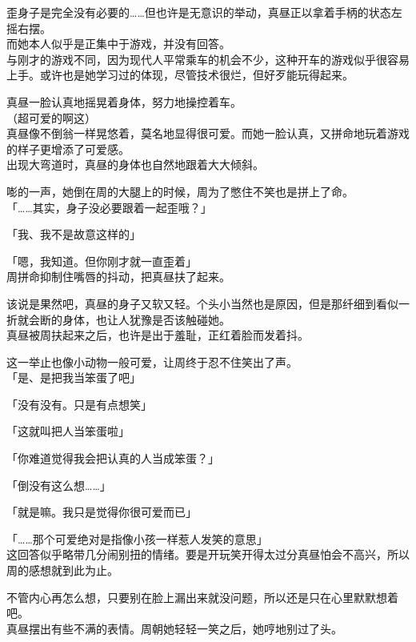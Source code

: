 歪身子是完全没有必要的……但也许是无意识的举动，真昼正以拿着手柄的状态左摇右摆。\\

而她本人似乎是正集中于游戏，并没有回答。\\

与刚才的游戏不同，因为现代人平常乘车的机会不少，这种开车的游戏似乎很容易上手。或许也是她学习过的体现，尽管技术很烂，但好歹能玩得起来。

真昼一脸认真地摇晃着身体，努力地操控着车。\\

（超可爱的啊这）\\

真昼像不倒翁一样晃悠着，莫名地显得很可爱。而她一脸认真，又拼命地玩着游戏的样子更增添了可爱感。\\

出现大弯道时，真昼的身体也自然地跟着大大倾斜。

嘭的一声，她倒在周的大腿上的时候，周为了憋住不笑也是拼上了命。\\

「……其实，身子没必要跟着一起歪哦？」

「我、我不是故意这样的」

「嗯，我知道。但你刚才就一直歪着」\\

周拼命抑制住嘴唇的抖动，把真昼扶了起来。

该说是果然吧，真昼的身子又软又轻。个头小当然也是原因，但是那纤细到看似一折就会断的身体，也让人犹豫是否该触碰她。\\

真昼被周扶起来之后，也许是出于羞耻，正红着脸而发着抖。

这一举止也像小动物一般可爱，让周终于忍不住笑出了声。\\

「是、是把我当笨蛋了吧」

「没有没有。只是有点想笑」

「这就叫把人当笨蛋啦」

「你难道觉得我会把认真的人当成笨蛋？」

「倒没有这么想……」

「就是嘛。我只是觉得你很可爱而已」

「……那个可爱绝对是指像小孩一样惹人发笑的意思」\\

这回答似乎略带几分闹别扭的情绪。要是开玩笑开得太过分真昼怕会不高兴，所以周的感想就到此为止。

不管内心再怎么想，只要别在脸上漏出来就没问题，所以还是只在心里默默想着吧。\\

真昼摆出有些不满的表情。周朝她轻轻一笑之后，她哼地别过了头。
